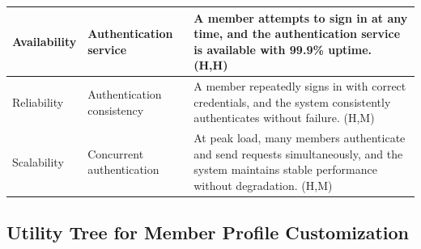 \documentclass{article}
\begin{document}
\begin{table}[H]
\begin{tabular}{|p{3cm}|p{4cm}|p{7cm}|}
        Availability
                                   & Authentication service
                                   & A member attempts to sign in at any time, and the authentication service is available with 99.9\% uptime. (H,H)                                                                       \\
        \hline

        Reliability
                                   & Authentication consistency
                                   & A member repeatedly signs in with correct credentials, and the system consistently authenticates without failure. (H,M)                                                               \\
        \hline

        Scalability
                                   & Concurrent authentication
                                   & At peak load, many members authenticate and send requests simultaneously, and the system maintains stable performance without degradation. (H,M)                                      \\
        \hline
    \end{tabular}
\end{table}

\subsection{Utility Tree for Member Profile Customization}
\end{document}
